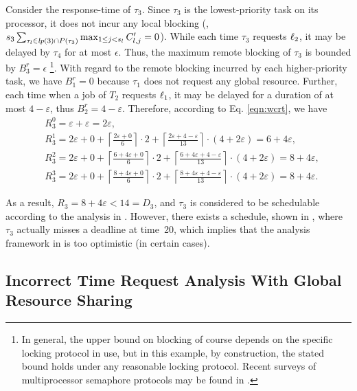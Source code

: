 Consider the response-time of $\tau_3$. Since $\tau_3$ is the lowest-priority task on its processor, it does not incur any local blocking (\ie,$s_3 \sum_{\tau_l \in \mathit{lp}(3) \cap P(\tau_3)} \max_{1 \leq j < s_l} C_{l,j}^{\prime} = 0$). While each time $\tau_3$ requests $\ell_2$, it may be delayed by $\tau_4$ for at most $\epsilon$. Thus, the maximum remote blocking of $\tau_3$ is bounded by $B_3^r = \epsilon$ \footnote{In general, the upper bound on blocking of course depends on the specific locking protocol in use, but in this example, by construction, the stated bound holds under any reasonable locking protocol. Recent surveys of multiprocessor semaphore protocols may be found in \cite{bbb-2013,yang-2015}.}. With regard to the remote blocking incurred by each higher-priority task, we have $B_1^r = 0$ because $\tau_1$ does not request any global resource. Further, each time when a job of $T_2$ requests $\ell_1$, it may be delayed for a duration of at most $4-\varepsilon$, thus $B_2^r = 4-\varepsilon$. Therefore, according to Eq. \ref{eqn:wcrt}, we have
\begin{align*}
& R_3^0 = \varepsilon + \varepsilon = 2\varepsilon, \\
& R_3^1 = 2\varepsilon + 0 + \left \lceil \frac{2\varepsilon + 0}{6} \right \rceil \cdot 2 + \left \lceil \frac{2\varepsilon + 4 - \varepsilon}{13} \right \rceil \cdot (4+2\varepsilon) =  6+4\varepsilon, \\
& R_3^2 = 2\varepsilon + 0 + \left \lceil \frac{6+4\varepsilon + 0}{6} \right \rceil \cdot 2 + \left \lceil \frac{6+4\varepsilon + 4-\varepsilon}{13} \right \rceil \cdot (4+2\varepsilon) = 8+4\varepsilon, \\
& R_3^3 = 2\varepsilon + 0 + \left \lceil \frac{8+4\varepsilon + 0}{6} \right \rceil \cdot 2 + \left \lceil \frac{8+4\varepsilon + 4-\varepsilon}{13} \right \rceil \cdot (4+2\varepsilon) = 8+4\varepsilon.
\end{align*}
 
As a result, $R_3 = 8+4\varepsilon < 14 = D_3$, and $\tau_3$ is considered to be schedulable according to the analysis in \cite{lakshmanan-2009}. However, there exists a schedule, shown in , where $\tau_3$  actually misses a deadline at time~20, which implies that the analysis framework in \cite{lakshmanan-2009} is too optimistic (in certain cases). 

\subsection{Incorrect Time Request Analysis With Global Resource Sharing}

